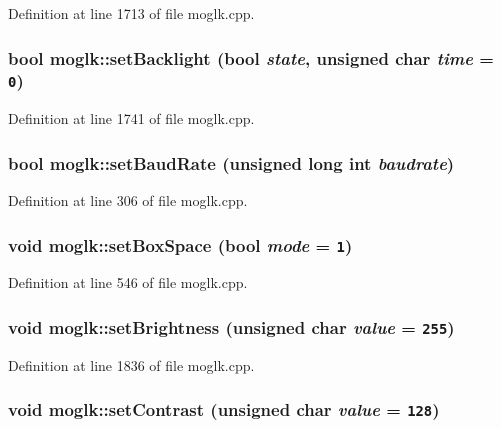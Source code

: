 Definition at line 1713 of file moglk.cpp.\hypertarget{classmoglk_d3b82640c34684aad6105f915ab874a4}{
\subsubsection[{setBacklight}]{\setlength{\rightskip}{0pt plus 5cm}bool moglk::setBacklight (bool {\em state}, \/  unsigned char {\em time} = {\tt 0})}}
\label{classmoglk_d3b82640c34684aad6105f915ab874a4}




Definition at line 1741 of file moglk.cpp.\hypertarget{classmoglk_788fca7601af41bd23d2f310ecc34100}{
\subsubsection[{setBaudRate}]{\setlength{\rightskip}{0pt plus 5cm}bool moglk::setBaudRate (unsigned long int {\em baudrate})}}
\label{classmoglk_788fca7601af41bd23d2f310ecc34100}




Definition at line 306 of file moglk.cpp.\hypertarget{classmoglk_ad564fea38cd80622152c152bfe62f4e}{
\subsubsection[{setBoxSpace}]{\setlength{\rightskip}{0pt plus 5cm}void moglk::setBoxSpace (bool {\em mode} = {\tt 1})}}
\label{classmoglk_ad564fea38cd80622152c152bfe62f4e}




Definition at line 546 of file moglk.cpp.\hypertarget{classmoglk_df864702b2368836b36a3888503e9040}{
\subsubsection[{setBrightness}]{\setlength{\rightskip}{0pt plus 5cm}void moglk::setBrightness (unsigned char {\em value} = {\tt 255})}}
\label{classmoglk_df864702b2368836b36a3888503e9040}




Definition at line 1836 of file moglk.cpp.\hypertarget{classmoglk_aef110fe43d65a957b0de17bde3b7436}{
\subsubsection[{setContrast}]{\setlength{\rightskip}{0pt plus 5cm}void moglk::setContrast (unsigned char {\em value} = {\tt 128})}}
\label{classmoglk_aef110fe43d65a957b0de17bde3b7436}




